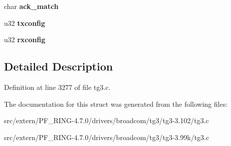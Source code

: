\begin{DoxyCompactItemize}
\item 
\hypertarget{structtg3__fiber__aneginfo_a50dcea1b5c5db3160194ed023e32b849}{
char {\bfseries ack\_\-match}}
\label{structtg3__fiber__aneginfo_a50dcea1b5c5db3160194ed023e32b849}

\item 
\hypertarget{structtg3__fiber__aneginfo_a58cd771463fa1d2e9c064dec2a2fbca5}{
u32 {\bfseries txconfig}}
\label{structtg3__fiber__aneginfo_a58cd771463fa1d2e9c064dec2a2fbca5}

\item 
\hypertarget{structtg3__fiber__aneginfo_a96ca53ad7a23aa02bf18a0e0847d25b8}{
u32 {\bfseries rxconfig}}
\label{structtg3__fiber__aneginfo_a96ca53ad7a23aa02bf18a0e0847d25b8}

\end{DoxyCompactItemize}


\subsection{Detailed Description}


Definition at line 3277 of file tg3.c.



The documentation for this struct was generated from the following files:\begin{DoxyCompactItemize}
\item 
src/extern/PF\_\-RING-\/4.7.0/drivers/broadcom/tg3/tg3-\/3.102/tg3.c\item 
src/extern/PF\_\-RING-\/4.7.0/drivers/broadcom/tg3/tg3-\/3.99k/tg3.c\end{DoxyCompactItemize}
